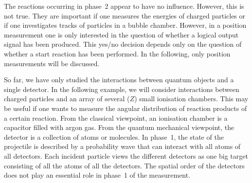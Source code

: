 \documentclass[11pt,a4paper]{article}
\begin{document}
The reactions occurring in phase~2 appear to have no influence.  
However, this is not true.  They are important if one measures the energies of charged particles or if one investigates tracks of particles in a bubble chamber.  
However, in a position measurement one is only interested in the question of whether a logical output signal has been produced.  This yes/no decision depends only on the question of whether a start reaction has been performed.
In the following, only position measurements will be discussed.  

So far, we have only studied the interactions between quantum objects and a single detector.  In the following example, we will consider interactions between charged particles and an array of several ($Z$) small ionisation chambers.  
This may be useful if one wants to measure the angular distribution of reaction products of a certain reaction.  
From the classical viewpoint, an ionisation chamber is a capacitor filled with argon gas.  From the quantum mechanical viewpoint, the detector is a collection of atoms or molecules.  
In phase~1, the state of the projectile is described by a probability wave that can interact with all atoms of all detectors.  Each incident particle views the different detectors as one big target consisting of all the atoms of all the detectors.  
The spatial order of the detectors does not play an essential role in phase~1 of the measurement.  
\end{document}
